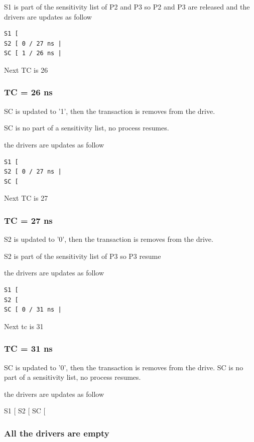 \documentclass{article}
\begin{document}
S1 is part of the sensitivity list of P2 and P3 so P2 and P3 are released and the drivers are updates as follow 

\begin{verbatim}
S1 [ 
S2 [ 0 / 27 ns |
SC [ 1 / 26 ns |
\end{verbatim}

Next TC is 26

\subsubsection{TC = 26 ns}

SC is updated to '1', then the transaction is removes from the drive.

SC is no part of a sensitivity list, no process resumes.

the drivers are updates as follow 

\begin{verbatim}
S1 [ 
S2 [ 0 / 27 ns |
SC [ 
\end{verbatim}

Next TC is 27

\subsubsection{TC = 27 ns}

S2 is updated to '0', then the transaction is removes from the drive.

S2 is  part of the sensitivity list of P3 so P3 resume 

the drivers are updates as follow 

\begin{verbatim}
S1 [ 
S2 [ 
SC [ 0 / 31 ns | 
\end{verbatim}

Next tc is 31

\subsubsection{TC = 31 ns}

SC is updated to '0', then the transaction is removes from the drive. SC is no part of a sensitivity list, no process resumes.

the drivers are updates as follow 

S1 [ 
S2 [ 
SC [

\subsubsection{All the drivers are empty }
\end{document}
